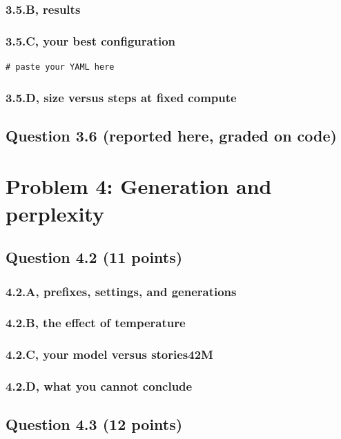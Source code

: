 \documentclass[11pt]{article}
\begin{document}
\subsubsection*{3.5.B, results}
\subsubsection*{3.5.C, your best configuration}
\begin{lstlisting}
# paste your YAML here
\end{lstlisting}
\subsubsection*{3.5.D, size versus steps at fixed compute}

\subsection*{Question 3.6 (reported here, graded on code)}

\section*{Problem 4: Generation and perplexity}

\subsection*{Question 4.2 (11 points)}
\subsubsection*{4.2.A, prefixes, settings, and generations}
\subsubsection*{4.2.B, the effect of temperature}
\subsubsection*{4.2.C, your model versus stories42M}
\subsubsection*{4.2.D, what you cannot conclude}

\subsection*{Question 4.3 (12 points)}
\end{document}

